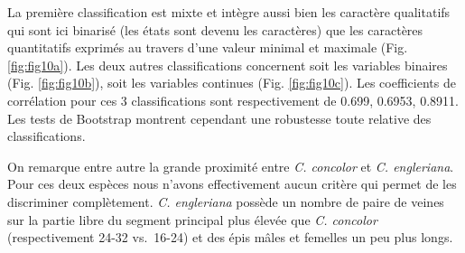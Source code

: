\documentclass[a4paper]{article}
\theoremstyle{definition}
\theoremstyle{definition}
\theoremstyle{definition}
\theoremstyle{remark}
\begin{document}
La première classification est mixte et intègre aussi bien les caractère
qualitatifs qui sont ici binarisé (les états sont devenu les caractères)
que les caractères quantitatifs exprimés au travers d'une valeur minimal
et maximale (Fig. \ref{fig:fig10a}). Les deux autres classifications
concernent soit les variables binaires (Fig. \ref{fig:fig10b}), soit les
variables continues (Fig. \ref{fig:fig10c}). Les coefficients de
corrélation pour ces 3 classifications sont respectivement de 0.699,
0.6953, 0.8911. Les tests de Bootstrap montrent cependant une robustesse
toute relative des classifications.

On remarque entre autre la grande proximité entre \emph{C. concolor} et
\emph{C. engleriana}. Pour ces deux espèces nous n'avons effectivement
aucun critère qui permet de les discriminer complètement. \emph{C.
engleriana} possède un nombre de paire de veines sur la partie libre du
segment principal plus élevée que \emph{C. concolor} (respectivement
24-32 vs.~16-24) et des épis mâles et femelles un peu plus longs.
\end{document}
